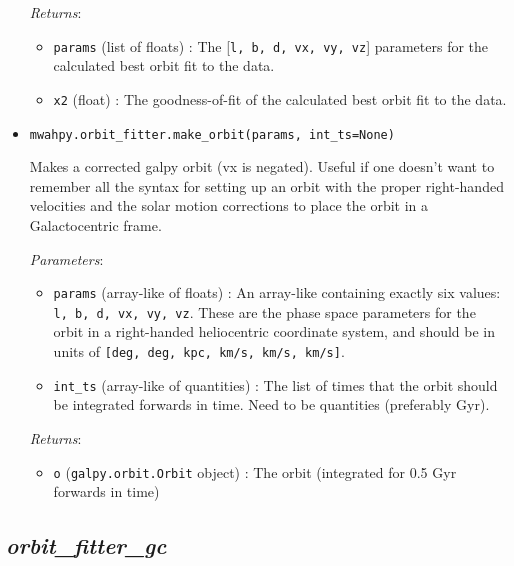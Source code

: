 \documentclass{article}
\begin{document}
\begin{itemize}
\textit{Returns}: \begin{itemize} 

\item \verb!params! (list of floats) : The [\verb!l, b, d, vx, vy, vz!] parameters for the calculated best orbit fit to the data.

\item \verb!x2! (float) : The goodness-of-fit of the calculated best orbit fit to the data.

\end{itemize}



\item \verb!mwahpy.orbit_fitter.make_orbit(params, int_ts=None)!

Makes a corrected galpy orbit (vx is negated). Useful if one doesn't want to remember all the syntax for setting up an orbit with the proper right-handed velocities and the solar motion corrections to place the orbit in a Galactocentric frame.

\textit{Parameters}: \begin{itemize}

\item \verb!params! (array-like of floats) : An array-like containing exactly six values: \verb!l, b, d, vx, vy, vz!. These are the phase space parameters for the orbit in a right-handed heliocentric coordinate system, and should be in units of \verb![deg, deg, kpc, km/s, km/s, km/s]!. 

\item \verb!int_ts! (array-like of quantities) : The list of times that the orbit should be integrated forwards in time. Need to be quantities (preferably Gyr). 

\end{itemize}

\textit{Returns}: \begin{itemize} 

\item \verb!o! (\verb!galpy.orbit.Orbit! object) : The orbit (integrated for 0.5 Gyr forwards in time) 

\end{itemize}



\end{itemize}



\subsection{\textit{orbit\_fitter\_gc}}
\end{document}
